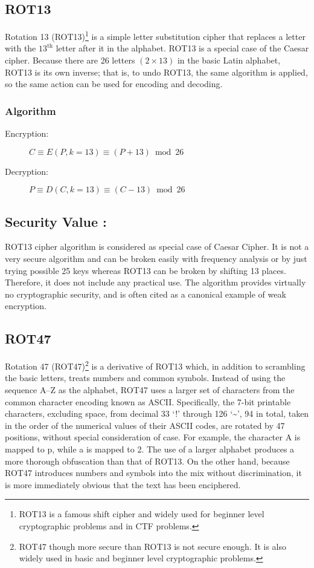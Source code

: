 \documentclass[british]{report}
\begin{document}
\subsection{ROT13}

Rotation 13 (ROT13)\footnote{ROT13 is a famous shift cipher and widely used for beginner level
	cryptographic problems and in CTF problems.} is a simple letter substitution cipher that replaces a letter with
the $13^{\text{th}}$ letter after it in the alphabet. ROT13 is a
special case of the Caesar cipher. Because there are 26 letters $(2\times13)$
in the basic Latin alphabet, ROT13 is its own inverse; that is, to
undo ROT13, the same algorithm is applied, so the same action can
be used for encoding and decoding.

\subsubsection{Algorithm}
\begin{description}
	\item [{Encryption:}] $C\equiv E(P,k=13)\equiv(P+13)\bmod26$
	\item [{Decryption:}] $P\equiv D(C,k=13)\equiv(C-13)\bmod26$
\end{description}

\subsection{Security Value : }

ROT13 cipher algorithm is considered as special case of Caesar Cipher.
It is not a very secure algorithm and can be broken easily with frequency
analysis or by just trying possible 25 keys whereas ROT13 can be broken
by shifting 13 places. Therefore, it does not include any practical
use. The algorithm provides virtually no cryptographic security, and
is often cited as a canonical example of weak encryption.

\subsection{ROT47}

Rotation 47 (ROT47)\footnote{ROT47 though more secure than ROT13 is not secure enough. It is also
	widely used in basic and beginner level cryptographic problems.} is a derivative of ROT13 which, in addition to scrambling the basic
letters, treats numbers and common symbols. Instead of using the sequence
A--Z as the alphabet, ROT47 uses a larger set of characters from
the common character encoding known as ASCII. Specifically, the 7-bit
printable characters, excluding space, from decimal 33 `!' through
126 `\textasciitilde ', 94 in total, taken in the order of the
numerical values of their ASCII codes, are rotated by 47 positions,
without special consideration of case. For example, the character
A is mapped to p, while a is mapped to 2. The use of a larger alphabet
produces a more thorough obfuscation than that of ROT13. On the other
hand, because ROT47 introduces numbers and symbols into the mix without
discrimination, it is more immediately obvious that the text has been
enciphered.
\end{document}
